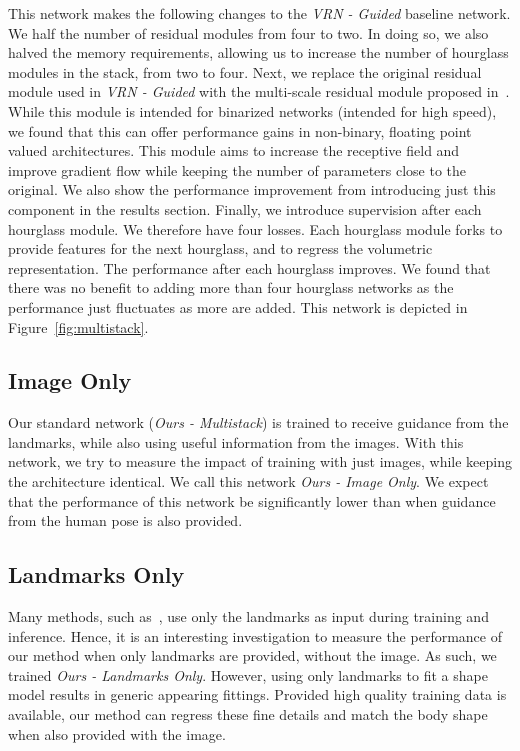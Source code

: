 This network makes the following changes to the \textit{VRN - Guided}
baseline network. We half the number of residual modules from four to
two. In doing so, we also halved the memory requirements, allowing us
to increase the number of hourglass modules in the stack, from two to
four. Next, we replace the original residual module used in
\textit{VRN - Guided} with the multi-scale residual module proposed
in~\cite{bulat2017binarized}. While this module is intended for
binarized networks (intended for high speed), we found that this can
offer performance gains in non-binary, floating point valued
architectures. This module aims to increase the receptive field and
improve gradient flow while keeping the number of parameters close to
the original. We also show the performance improvement from
introducing just this component in the results section. Finally, we
introduce supervision after each hourglass module. We therefore have
four losses. Each hourglass module forks to provide features for the
next hourglass, and to regress the volumetric representation. The
performance after each hourglass improves. We found that there was no
benefit to adding more than four hourglass networks as the performance
just fluctuates as more are added. This network is depicted in
Figure~\ref{fig:multistack}.

\subsection{Image Only} %

Our standard network (\textit{Ours - Multistack}) is trained to
receive guidance from the landmarks, while also using useful
information from the images. With this network, we try to measure the
impact of training with just images, while keeping the architecture
identical. We call this network \textit{Ours - Image Only}. We expect
that the performance of this network be significantly lower than when
guidance from the human pose is also provided.

\subsection{Landmarks Only} %

Many methods, such
as~\cite{bogo2016smplify,ramakrishna2012reconstructing}, use only the
landmarks as input during training and inference. Hence, it is an
interesting investigation to measure the performance of our method
when only landmarks are provided, without the image. As such, we
trained \textit{Ours - Landmarks Only}. However, using only landmarks
to fit a shape model results in generic appearing fittings. Provided
high quality training data is available, our method can regress these
fine details and match the body shape when also provided with the
image.

